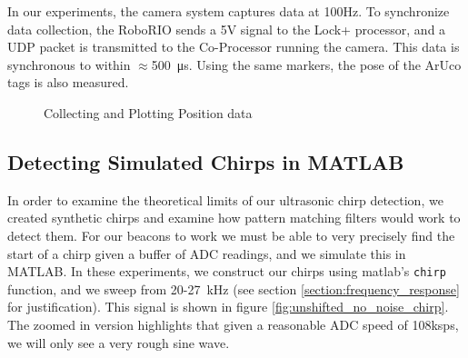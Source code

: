 \documentclass{article}
\begin{document}
    In our experiments, the camera system captures data at 100Hz. To synchronize data collection, the RoboRIO sends a 5V signal to the Lock+ processor, and a UDP packet is transmitted to the Co-Processor running the camera. This data is synchronous to within $\approx$\SI{500}{\micro\second}. Using the same markers, the pose of the ArUco tags is also measured.

    \begin{figure}[H]%
      \centering
      \qquad
      \caption{Collecting and Plotting Position data}%
      \label{fig:positionData}%
    \end{figure}


  \subsection{Detecting Simulated Chirps in MATLAB}

    In order to examine the theoretical limits of our ultrasonic chirp detection, we created synthetic chirps and examine how pattern matching filters would work to detect them. For our beacons to work we must be able to very precisely find the start of a chirp given a buffer of ADC readings, and we simulate this in MATLAB. In these experiments, we construct our chirps using matlab's \texttt{chirp} function, and we sweep from 20-27\SI{}{\kilo\hertz} (see section \ref{section:frequency_response} for justification). This signal is shown in figure \ref{fig:unshifted_no_noise_chirp}. The zoomed in version highlights that given a reasonable ADC speed of 108ksps, we will only see a very rough sine wave.
\end{document}
